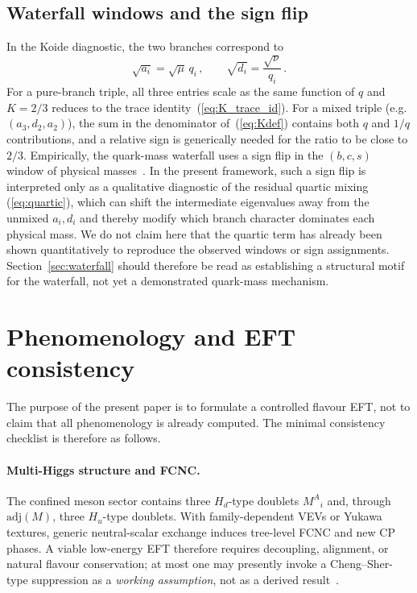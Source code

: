 \documentclass[11pt,a4paper]{article}
\makeatletter
\newcommand{\adj}{\mathrm{adj}}
\newcommand{\eg}{e.g.\@}
\makeatother
\begin{document}
\subsection{Waterfall windows and the sign flip}
\label{sec:waterfall_windows}

In the Koide diagnostic, the two branches correspond to
\begin{equation}
  \sqrt{a_i}=\sqrt{\mu}\,q_i\,,
  \qquad
  \sqrt{d_i}=\frac{\sqrt{\nu}}{q_i}\,.
  \label{eq:sqrt_branches}
\end{equation}
For a pure-branch triple, all three entries scale as the same function of $q$
and $K=2/3$ reduces to the trace identity~(\ref{eq:K_trace_id}).
For a mixed triple (\eg $(a_3,d_2,a_2)$), the sum in the denominator of~(\ref{eq:Kdef})
contains both $q$ and $1/q$ contributions, and a relative sign is generically
needed for the ratio to be close to $2/3$.
Empirically, the quark-mass waterfall uses a sign flip in the $(b,c,s)$ window
of physical masses~\cite{Zenczykowski:2012}.  In the present framework, such a
sign flip is interpreted only as a qualitative diagnostic of the residual
quartic mixing
(\ref{eq:quartic}), which can shift the intermediate eigenvalues away from the
unmixed $a_i,d_i$ and thereby modify which branch character dominates each
physical mass.  We do not claim here that the quartic term has already been
shown quantitatively to reproduce the observed windows or sign assignments.
Section~\ref{sec:waterfall} should therefore be read as establishing a
structural motif for the waterfall, not yet a demonstrated quark-mass
mechanism.

\section{Phenomenology and EFT consistency}
\label{sec:pheno}

The purpose of the present paper is to formulate a controlled flavour EFT, not
to claim that all phenomenology is already computed.  The minimal consistency
checklist is therefore as follows.

\paragraph{Multi-Higgs structure and FCNC.}
The confined meson sector contains three $H_d$-type doublets $M^{A}{}_i$ and,
through $\adj(M)$, three $H_u$-type doublets.  With family-dependent VEVs or
Yukawa textures, generic neutral-scalar exchange induces tree-level FCNC and
new CP phases.  A viable low-energy EFT therefore requires decoupling,
alignment, or natural flavour conservation; at most one may presently invoke a
Cheng--Sher-type suppression as a \emph{working assumption}, not as a derived
result~\cite{Branco:2011iw,ChengSher:1987}.
\end{document}
